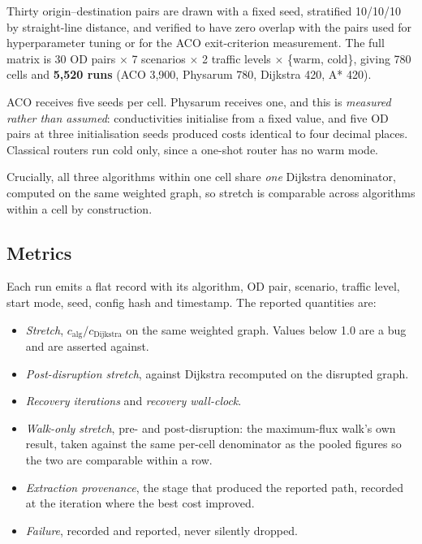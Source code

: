 Thirty origin--destination pairs are drawn with a fixed seed, stratified
10/10/10 by straight-line distance, and verified to have zero overlap with
the pairs used for hyperparameter tuning or for the ACO exit-criterion
measurement. The full matrix is 30 OD pairs $\times$ 7 scenarios $\times$ 2
traffic levels $\times$ \{warm, cold\}, giving 780 cells and
\textbf{5{,}520 runs} (ACO 3{,}900, Physarum 780, Dijkstra 420, A* 420).

ACO receives five seeds per cell. Physarum receives one, and this is
\emph{measured rather than assumed}: conductivities initialise from a fixed
value, and five OD pairs at three initialisation seeds produced costs
identical to four decimal places. Classical routers run cold only, since a
one-shot router has no warm mode.

Crucially, all three algorithms within one cell share \emph{one} Dijkstra
denominator, computed on the same weighted graph, so stretch is comparable
across algorithms within a cell by construction.

\subsection{Metrics}

Each run emits a flat record with its algorithm, OD pair, scenario, traffic
level, start mode, seed, config hash and timestamp. The reported quantities
are:

\begin{itemize}\setlength{\itemsep}{1pt}
\item \emph{Stretch}, $c_{\text{alg}} / c_{\text{Dijkstra}}$ on the same
  weighted graph. Values below 1.0 are a bug and are asserted against.
\item \emph{Post-disruption stretch}, against Dijkstra recomputed on the
  disrupted graph.
\item \emph{Recovery iterations} and \emph{recovery wall-clock}.
\item \emph{Walk-only stretch}, pre- and post-disruption: the maximum-flux
  walk's own result, taken against the same per-cell denominator as the
  pooled figures so the two are comparable within a row.
\item \emph{Extraction provenance}, the stage that produced the reported
  path, recorded at the iteration where the best cost improved.
\item \emph{Failure}, recorded and reported, never silently dropped.
\end{itemize}

